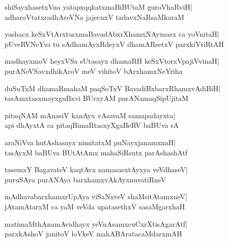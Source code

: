 \documentclass[twoside,12pt,openright]{book}
\newcounter{shloka}[chapter]
\begin{document}
\begin{shloka}%
shiSayxhasetxVna yatapxqqkatxmaBiBUtaM guroVhaRviH|\\
adharoVtatxradhAreVNa jajecnxV tadavxNaRsaMkaraM
\end{shloka}

\begin{shloka}%
yashacx keSxVtArxtasxmaBavadAbxrXhamxNAyxsasx ca yoVnitaH|\\
pUveRVNeYva tu sAdhamAyxRdeyxV dhamARsetxV parxkiVtiRtAH
\end{shloka}

\begin{shloka}%
madhayxmoV heyxVSa sUtasayx dhamaRH keSxVtorxVpajiVvinaH|\\
purANeVSavxdhikAroV meV vihitoV bArxhamxNeYriha
\end{shloka}

\begin{shloka}%
duSuTxM dhamaRmahaM paqSoTxV BavadiBxbarxRhamxvAdiBiH|\\
tasAmxtasxmayxguBxvi BUrxyAM purANamaqSipUjitaM
\end{shloka}

\begin{shloka}%
pitaqNAM mAnasiV kanAyx vAsavaM samapadayxta|\\
api dhAyxtA ca pitaqBimaRtasxyXgaBeRV baBUva sA
\end{shloka}

\begin{shloka}%
araNiVva hutAshasayx nimitatxM puNayxjanamxnaH|\\
tasAyxM baBUva BUtAtAmx mahaSiRsutx parAshashAtf
\end{shloka}

\begin{shloka}%
tasemxY BagavateV kaqtAvx namasasxtAyxya veVdhaseV|\\
puruSAya purANAya barxhamxvAkAyxnuvatiRneV
\end{shloka}

\begin{shloka}%
mAdhavabarxhamxrUpAya viSaNxveV shaMsitAtamxneV|\\
jAtamAtarxM ca yaM veVda upatasethxV sasaMgarxhaH
\end{shloka}

\begin{shloka}%
matimaMthAnamAvidhayx yeVnAsamxcuCxrXtisAgarAtf|\\
parxkAshoV janitoV loVkeV mahABAratacaMdarxmAH
\end{shloka}
\end{document}
